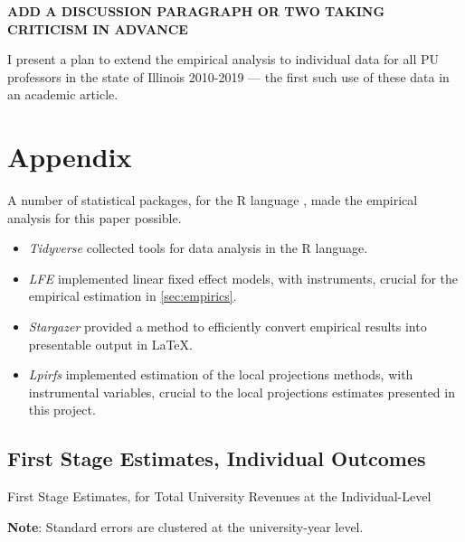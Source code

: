 \documentclass[notitlepage,12pt]{article}
\begin{document}
\textbf{ADD A DISCUSSION PARAGRAPH OR TWO TAKING CRITICISM IN ADVANCE}

I present a plan to extend the empirical analysis to individual data for all PU professors in the state of Illinois 2010-2019 --- the first such use of these data in an academic article.






\appendix
\section{Appendix}
\label{appendix}
A number of statistical packages, for the R language \citep{R2022}, made the empirical analysis for this paper possible.
\begin{itemize}
    \item \textit{Tidyverse} \citep{tidyverse} collected tools for data analysis in the R language.
    \item \textit{LFE} \citep{lfe} implemented linear fixed effect models, with instruments, crucial for the empirical estimation in \autoref{sec:empirics}.
    \item \textit{Stargazer} \citep{stargazer} provided a method to efficiently convert empirical results into presentable output in \LaTeX.
    \item \textit{Lpirfs} \citep{lpirfs2019} implemented estimation of the \cite{jorda2005} local projections methods, with instrumental variables, crucial to the local projections estimates presented in this project.
\end{itemize}

\subsection{First Stage Estimates, Individual Outcomes}
\label{appendix:part1}
\begin{table}[H]
    \onehalfspacing
    \centering
    \caption{First Stage Estimates, for Total University Revenues at the Individual-Level}
    \makebox[\textwidth][c]{}
    \label{tab:firststage-illinois}
    \begin{flushleft}
        \footnotesize
        \textbf{Note}: Standard errors are clustered at the university-year level.
    \end{flushleft}
\end{table}
\end{document}
